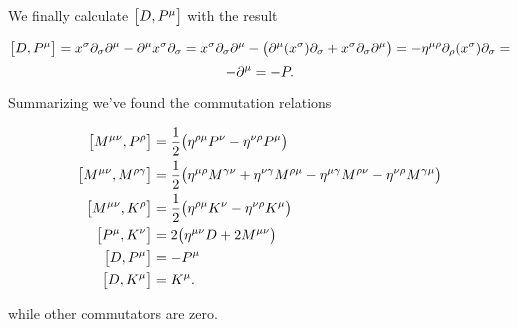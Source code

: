 We finally calculate $\big[D, P^{\mu}\big]$ with the result 

$$
\big[D, P^{\mu}\big]=
x^\sigma \partial_\sigma \partial^\mu
-\partial^\mu x^\sigma \partial_\sigma=
x^\sigma \partial_\sigma \partial^\mu-
    \big(
        \partial^\mu (x^\sigma) \partial_\sigma
        +x^\sigma \partial_\sigma\partial^\mu
    \big)=-\eta^{\mu\rho}\partial_\rho(x^\sigma)\partial_\sigma=
$$
$$
-\partial^\mu=-P.
$$

Summarizing we've found the commutation relations

\begin{align}
    \big[M^{\mu \nu}, P^\rho\big]&=\frac{1}{2} \big( \eta^{\rho \mu}P^\nu-\eta^{\nu \rho}P^\mu \big) \label{eq:MP} 
    \\
    \big[M^{\mu \nu}, M^{\rho \gamma}\big]&=\frac{1}{2}\big(
    \eta^{\mu \rho} M^{\gamma \nu}+\eta^{\nu \gamma} M^{\rho \mu}
    -\eta^{\mu \gamma} M^{\rho \nu}-\eta^{\nu \rho} M^{\gamma \mu}\big) \label{eq:MM}
    \\
    \big[M^{\mu \nu}, K^\rho\big]&= \frac{1}{2}\big( \eta^{\rho \mu}K^\nu-\eta^{\nu \rho}K^\mu \big) \label{eq:MK}
    \\
    \big[P^{\mu}, K^\nu\big]&=2 \big( \eta^{\mu \nu}D+ 2M^{\mu \nu} \label{eq:PK} \big)
    \\
    \big[D, P^\mu\big]&=-P^\mu
    \\
    \big[D, K^\mu\big]&=K^\mu.
\end{align}

while other commutators are zero.